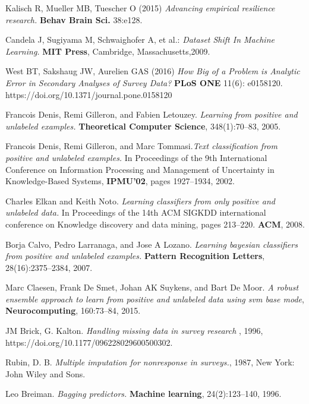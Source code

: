 \begin{thebibliography}{9}

Kalisch R, Mueller MB, Tuescher O (2015) \textit{Advancing empirical resilience research.} \textbf{Behav Brain Sci.} 38:e128.

Candela J, Sugiyama M, Schwaighofer A, et al.: \textit{Dataset Shift In Machine Learning.} \textbf{MIT Press}, Cambridge, Massachusetts,2009.

West BT, Sakshaug JW, Aurelien GAS (2016) \textit{How Big of a Problem is Analytic Error in Secondary Analyses of Survey Data?} \textbf{PLoS ONE} 11(6): e0158120. https://doi.org/10.1371/journal.pone.0158120

 Francois Denis, Remi Gilleron, and Fabien Letouzey. \textit{Learning from positive and unlabeled examples.} \textbf{Theoretical Computer Science}, 348(1):70–83, 2005. 

Francois Denis, Remi Gilleron, and Marc Tommasi.\textit{Text classiﬁcation from positive and unlabeled examples.} In Proceedings of the 9th International Conference on Information Processing and Management of Uncertainty in Knowledge-Based Systems, \textbf{IPMU'02}, pages 1927–1934, 2002.

Charles Elkan and Keith Noto. \textit{Learning classifiers from only positive and unlabeled data.} In Proceedings of the 14th ACM SIGKDD international conference on Knowledge discovery and data mining, pages 213–220. \textbf{ACM}, 2008.

Borja Calvo, Pedro Larranaga, and Jose A Lozano. \textit{Learning bayesian classifiers from positive and unlabeled examples.} \textbf{Pattern Recognition Letters}, 28(16):2375–2384, 2007. 

Marc Claesen, Frank De Smet, Johan AK Suykens, and Bart De Moor. \textit{A robust ensemble approach to learn from positive and unlabeled data using svm base mode}, \textbf{Neurocomputing}, 160:73–84, 2015.

JM Brick, G. Kalton. \textit{Handling missing data in survey research }, 1996, https://doi.org/10.1177/096228029600500302.

Rubin, D. B. \textit{Multiple imputation for nonresponse in surveys.}, 1987, New York: John Wiley and Sons.

Leo Breiman. \textit{Bagging predictors.} \textbf{Machine learning}, 24(2):123–140, 1996.


\end{thebibliography}
